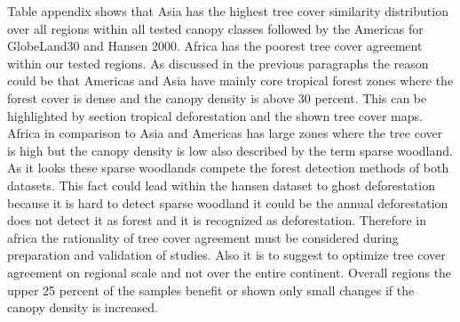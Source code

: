 			 Table appendix shows that Asia has the highest tree cover similarity distribution over all regions within all tested canopy classes followed by the Americas for GlobeLand30 and Hansen 2000. Africa has the poorest tree cover agreement within our tested regions. As discussed in the previous paragraphs the reason could be that Americas and Asia have mainly core tropical forest zones where the forest cover is dense and the canopy density is above 30 percent. This can be highlighted by section tropical deforestation and the shown tree cover maps. Africa in comparison to Asia and Americas has large zones where the tree cover is high but the canopy density is low also described by the term sparse woodland. As it looks these sparse woodlands compete the forest detection methods of both datasets. This fact could lead within the hansen dataset to ghost deforestation because it is hard to detect sparse woodland it could be the annual deforestation does not detect it as forest and it is recognized as deforestation. Therefore in africa the rationality of tree cover agreement must be considered during preparation and validation of studies. Also it is to suggest to optimize tree cover agreement on regional scale and not over the entire continent. Overall regions the upper 25 percent of the samples benefit or shown only small changes if the canopy density is increased.

